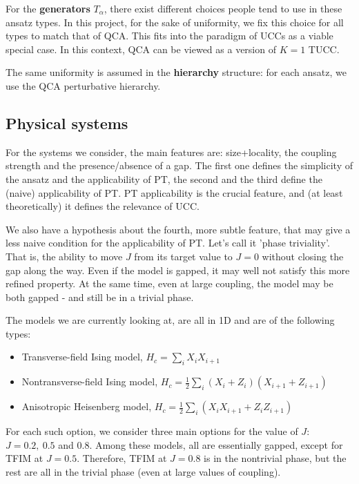 \documentclass[10pt, a4paper]{article}
\begin{document}
For the \textbf{generators} $T_{\alpha}$, there exist different choices people tend to use in these ansatz types. In this project, for the sake of uniformity, we fix this choice for all types to match that of QCA. This fits into the paradigm of UCCs as a viable special case. In this context, QCA can be viewed as a version of $K=1$ TUCC.

The same uniformity is assumed in the \textbf{hierarchy} structure: for each ansatz, we use the QCA perturbative hierarchy.

\subsection*{Physical systems}

For the systems we consider, the main features are: size+locality, the coupling strength and the presence/absence of a gap. The first one defines the simplicity of the ansatz and the applicability of PT, the second and the third define the (naive) applicability of PT. PT applicability is the crucial feature, and (at least theoretically) it defines the relevance of UCC.

We also have a hypothesis about the fourth, more subtle feature, that may give a less naive condition for the applicability of PT. Let's call it 'phase triviality'. That is, the ability to move $J$ from its target value to $J=0$ without closing the gap along the way. Even if the model is gapped, it may well not satisfy this more refined property. At the same time, even at large coupling, the model may be both gapped - and still be in a trivial phase.

The models we are currently looking at, are all in 1D and are of the following types:
\begin{itemize}
\item Transverse-field Ising model, $H_c=\sum_i X_i X_{i+1}$
\item Nontransverse-field Ising model, $H_c=\frac{1}{2}\sum_i (X_i+Z_i) (X_{i+1}+Z_{i+1})$
\item Anisotropic Heisenberg model,  $H_c=\frac{1}{2}\sum_i (X_iX_{i+1}+Z_iZ_{i+1})$
\end{itemize}

For each such option, we consider three main options for the value of $J$: $J=0.2,~0.5$ and $0.8$. Among these models, all are essentially gapped, except for TFIM at $J=0.5$. Therefore, TFIM at $J=0.8$ is in the nontrivial phase, but the rest are all in the trivial phase (even at large values of coupling).
\end{document}
